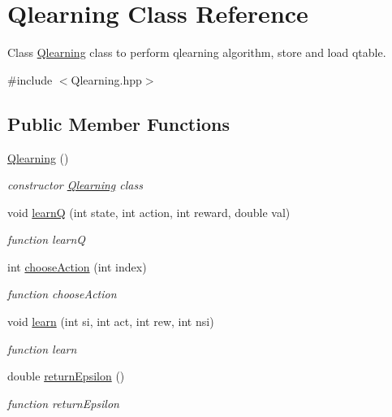 \hypertarget{classQlearning}{}\section{Qlearning Class Reference}
\label{classQlearning}


Class \hyperlink{classQlearning}{Qlearning} class to perform qlearning algorithm, store and load qtable.  




{\ttfamily \#include $<$Qlearning.\+hpp$>$}

\subsection*{Public Member Functions}
\begin{DoxyCompactItemize}
\item 
\hyperlink{classQlearning_a47decd46b0a181ccafbb0aba75ece448}{Qlearning} ()
\begin{DoxyCompactList}\small\item\em constructor \hyperlink{classQlearning}{Qlearning} class \end{DoxyCompactList}\item 
void \hyperlink{classQlearning_af55b20f8394ece2f46d461bc3badb955}{learnQ} (int state, int action, int reward, double val)
\begin{DoxyCompactList}\small\item\em function learnQ \end{DoxyCompactList}\item 
int \hyperlink{classQlearning_a67700ac6eebe8fa29c6fb187f332ef7d}{choose\+Action} (int index)
\begin{DoxyCompactList}\small\item\em function choose\+Action \end{DoxyCompactList}\item 
void \hyperlink{classQlearning_aab26b98bbad66dc95796efe6f437b06a}{learn} (int si, int act, int rew, int nsi)
\begin{DoxyCompactList}\small\item\em function learn \end{DoxyCompactList}\item 
double \hyperlink{classQlearning_a7f458df1e61c722831932e27dab625cc}{return\+Epsilon} ()
\begin{DoxyCompactList}\small\item\em function return\+Epsilon \end{DoxyCompactList}\item 

\end{DoxyCompactItemize}
